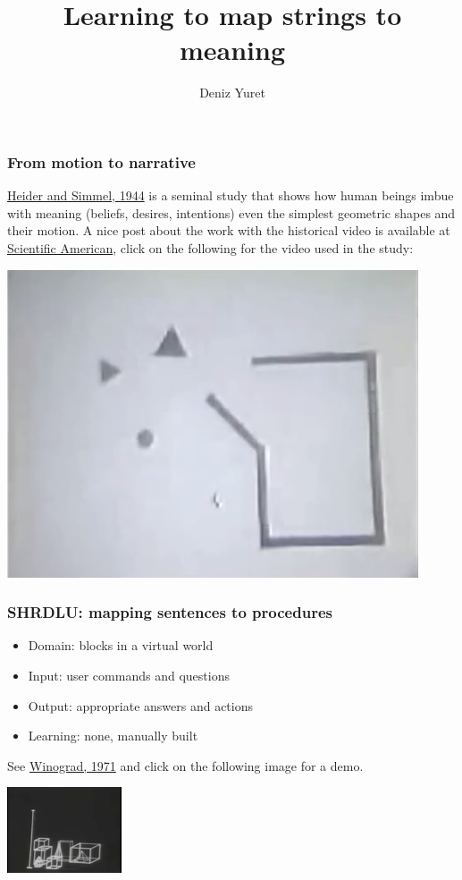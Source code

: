\documentclass[ignorenonframetext]{beamer}
\title{Learning to map strings to meaning}
\author{Deniz Yuret}
\begin{document}
\begin{frame}
\maketitle
\end{frame}

\begin{frame}\frametitle{From motion to narrative}
\href{http://www.jstor.org/stable/pdfplus/10.2307/1416950.pdf}{Heider
  and Simmel, 1944} is a seminal study that shows how human beings
imbue with meaning (beliefs, desires, intentions) even the simplest
geometric shapes and their motion.  A nice post about the work with
the historical video is available at
\href{http://blogs.scientificamerican.com/thoughtful-animal/2013/03/08/animating-anthropomorphism-giving-minds-to-geometric-shapes-video/}{Scientific
  American}, click on the following for the video used in the study:
\begin{center}
\href{http://www.youtube.com/watch?v=VTNmLt7QX8E}{
\includegraphics[width=.5\textwidth]{images/heider-simmel.png}}
\end{center}
\end{frame}

\begin{frame}\frametitle{SHRDLU: mapping sentences to procedures}

\begin{itemize}
\item Domain: blocks in a virtual world
\item Input: user commands and questions
\item Output: appropriate answers and actions
\item Learning: none, manually built
\end{itemize}

See \href{http://hci.stanford.edu/~winograd/shrdlu}{Winograd, 1971}
and click on the following image for a demo.

\begin{center}
\href{http://youtu.be/QAJz4YKUwqw}{
\includegraphics[]{images/winograd-shrdlu.png}}
\end{center}

\end{frame}
\end{document}
